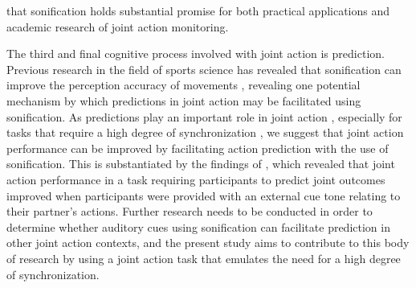 \documentclass[10pt,a4paper,onecolumn]{article}
\begin{document}
that sonification holds substantial promise for both practical applications and academic research of joint action monitoring.

The third and final cognitive process involved with joint action is prediction. Previous research in the field of sports science has revealed that sonification can improve the perception accuracy of movements \autocite{effenbergMovementSonificationEffects2005,schmitzObservationSonifiedMovements2013}, revealing one potential mechanism by which predictions in joint action may be facilitated using sonification. As predictions play an important role in joint action \autocite{sebanzJointActionBodies2006}, especially for tasks that require a high degree of synchronization \autocite{vesperMinimalArchitectureJoint2010}, we suggest that joint action performance can be improved by facilitating action prediction with the use of sonification. This is substantiated by the findings of \textcite{knoblichActionCoordinationGroups2003}, which revealed that joint action performance in a task requiring participants to predict joint outcomes improved when participants were provided with an external cue tone relating to their partner's actions. Further research needs to be conducted in order to determine whether auditory cues using sonification can facilitate prediction in other joint action contexts, and the present study aims to contribute to this body of research by using a joint action task that emulates the need for a high degree of synchronization.
\end{document}
